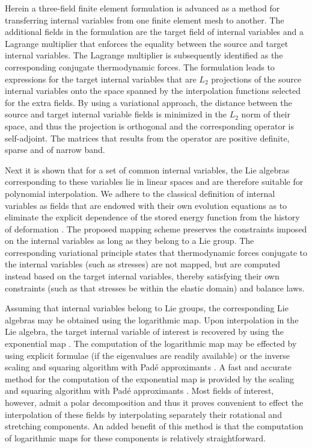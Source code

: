 \documentclass[12pt]{article}
\begin{document}
Herein a three-field finite element formulation is advanced as a
method for transferring internal variables from one finite element
mesh to another. The additional fields in the formulation are the
target field of internal variables and a Lagrange multiplier that
enforces the equality between the source and target internal
variables. The Lagrange multiplier is subsequently identified as the
corresponding conjugate thermodynamic forces. The formulation leads to
expressions for the target internal variables that are $L_2$
projections of the source internal variables onto the space spanned by
the interpolation functions selected for the extra fields. By using a
variational approach, the distance between the source and target
internal variable fields is minimized in the $L_2$ norm of their
space, and thus the projection is orthogonal and the corresponding
operator is self-adjoint. The matrices that results from the operator
are positive definite, sparse and of narrow band.

Next it is shown that for a set of common internal variables, the Lie
algebras corresponding to these variables lie in linear spaces and are
therefore suitable for polynomial interpolation.  We adhere to the
classical definition of internal variables as fields that are endowed
with their own evolution equations as to eliminate the explicit
dependence of the stored energy function from the history of
deformation \citep{Muschik:2001, Antman:2005}. The proposed mapping
scheme preserves the constraints imposed on the internal variables as
long as they belong to a Lie group. The corresponding variational
principle states that thermodynamic forces conjugate to the internal
variables (such as stresses) are not mapped, but are computed instead
based on the target internal variables, thereby satisfying their own
constraints (such as that stresses be within the elastic domain) and
balance laws.

Assuming that internal variables belong to Lie groups, the
corresponding Lie algebras may be obtained using the logarithmic
map. Upon interpolation in the Lie algebra, the target internal
variable of interest is recovered by using the exponential map
\citep{Marsden.Ratiu:1999, Sepanski:2007, Kosmann-Schwarzbach:2009,
  Gallier:2011}. The computation of the logarithmic map may be
effected by using explicit formulae (if the eigenvalues are readily
available) \citep{Jog:2008} or the inverse scaling and squaring
algorithm with Pad\'e approximants \citep{Cheng.etal:2001,
  Davies.Higham:2003}.  A fast and accurate method for the computation
of the exponential map is provided by the scaling and squaring
algorithm with Pad\'e approximants
\citep{Higham:2001,Higham:2005}. Most fields of interest, however,
admit a polar decomposition and thus it proves convenient to effect
the interpolation of these fields by interpolating separately their
rotational and stretching components. An added benefit of this method
is that the computation of logarithmic maps for these components is
relatively straightforward.
\end{document}
